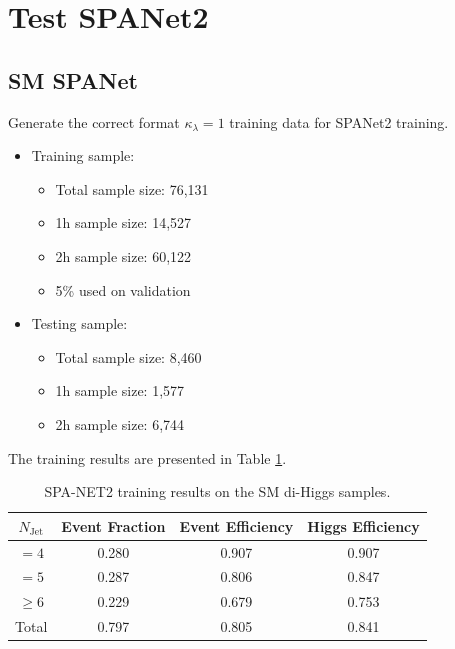 \documentclass[12pt]{article}
\begin{document}
\section{Test SPANet2}%
\label{sec:test_spanet2}
	\subsection{SM SPANet}%
	\label{sub:sm_spanet}
		Generate the correct format $\kappa_\lambda = 1$ training data for SPANet2 training.
		\begin{itemize}
			\item Training sample:
			\begin{itemize}
				\item Total sample size: 76,131
				\item 1h sample size: 14,527
				\item 2h sample size: 60,122
				\item 5\% used on validation
			\end{itemize}
			\item Testing sample:
			\begin{itemize}
				\item Total sample size: 8,460
				\item 1h sample size: 1,577
				\item 2h sample size: 6,744
			\end{itemize}
		\end{itemize}
		The training results are presented in Table \ref{tab:SPANet2_diHiggs_4btag_DL1r_pt40_k1}.
		\begin{table}[htpb]
			\centering
			\caption{SPA-NET2 training results on the SM di-Higgs samples.}
			\label{tab:SPANet2_diHiggs_4btag_DL1r_pt40_k1}
			\begin{tabular}{c|c|cc}
				$N_\text{Jet}$ & Event Fraction & Event Efficiency & Higgs Efficiency \\
				\hline
				$=4$	  &   0.280             &    0.907              &    0.907             \\
				$=5$	  &   0.287             &    0.806              &    0.847             \\
				$\ge 6$	  &   0.229             &    0.679              &    0.753             \\
				Total	  &   0.797             &    0.805              &    0.841             \\
			\end{tabular}
		\end{table}
\end{document}
